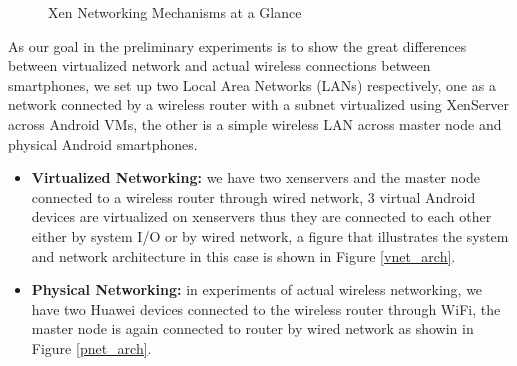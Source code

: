 \documentclass[journal,comsoc]{IEEEtran}
\begin{document}
\begin{figure}
  \centering
  \caption{Xen Networking Mechanisms at a Glance}
  \label{xen_net} %
\end{figure}

As our goal in the preliminary experiments is to show the great differences between virtualized network and actual wireless connections between smartphones, we set up two Local Area Networks (LANs) respectively, one as a network connected by a wireless router with a subnet virtualized using XenServer across Android VMs, the other is a simple wireless LAN across master node and physical Android smartphones. 
\begin{itemize}
	\item {\bf Virtualized Networking: }we have two xenservers and the master node connected to a wireless router through wired network, 3 virtual Android devices are virtualized on xenservers thus they are connected to each other either by system I/O or by wired network, a figure that illustrates the system and network architecture in this case is shown in Figure \ref{vnet_arch}.
	\item {\bf Physical Networking: }in experiments of actual wireless networking, we have two Huawei devices connected to the wireless router through WiFi, the master node is again connected to router by wired network as showin in Figure \ref{pnet_arch}.
\end{itemize}
\end{document}
